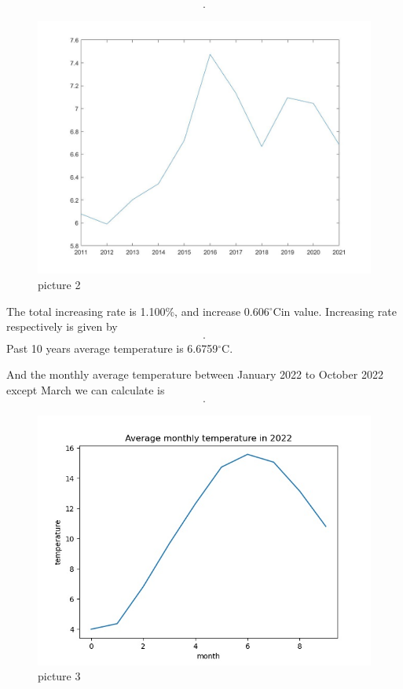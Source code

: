 \documentclass{apmcmthesis}
\def\oc{$^{\circ}$C\;}
\begin{document}
\begin{align*}
  [6.0780,5.9890, 6.2030, 6.3420 , 6.7220 ,7.4750 , 7.1340 , 6.6680 , 7.0950  ,7.0450 ,6.6840].
\end{align*}

\begin{figure}[htbp]
  \centering
  \includegraphics[scale=0.2]{past 10 avg.jpg}
  \caption*{picture 2}\label{fig2}
\end{figure}

The total increasing rate is 1.100\%, and increase 0.606\oc in value.
Increasing rate respectively is given by
\begin{align*}
  [ -0.0941,-0.0146,0.0357,0.0224,0.0599,0.1120, -0.0456,-0.0653, 0.0640,-0.0070,-0.0512].
\end{align*}
Past 10 years average temperature is 6.6759\oc. 

And the monthly average temperature between January 2022 to October 2022 except March we can calculate is 
\begin{align*}
  [3.989,  4.358, 6.812,9.665, 12.313, 14.742, 15.588, 15.07 ,13.151, 10.811].
\end{align*}
\begin{figure}[htbp]
  \centering
  \includegraphics[scale=0.35]{Average monthly temperature in 2022.jpg}
  \caption*{picture 3}\label{fig3}
\end{figure}
\end{document}
